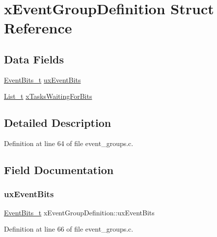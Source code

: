 \hypertarget{structx_event_group_definition}{}\section{x\+Event\+Group\+Definition Struct Reference}
\label{structx_event_group_definition}
\subsection*{Data Fields}
\begin{DoxyCompactItemize}
\item 
\hyperlink{event__groups_8h_ab2f21b93db0b2a0ab64d7a81ff32ac2e}{Event\+Bits\+\_\+t} \hyperlink{structx_event_group_definition_ad7c19a46f5f4557e466209962b5e4610}{ux\+Event\+Bits}
\item 
\hyperlink{list_8h_afd590ef6400071b4d63d65ef90bea7f4}{List\+\_\+t} \hyperlink{structx_event_group_definition_a6570ba98d93dcba9cb03de0c62df9044}{x\+Tasks\+Waiting\+For\+Bits}
\end{DoxyCompactItemize}


\subsection{Detailed Description}


Definition at line 64 of file event\+\_\+groups.\+c.



\subsection{Field Documentation}
\mbox{\label{structx_event_group_definition_ad7c19a46f5f4557e466209962b5e4610}} 
\subsubsection{\texorpdfstring{ux\+Event\+Bits}{uxEventBits}}
{\footnotesize\ttfamily \hyperlink{event__groups_8h_ab2f21b93db0b2a0ab64d7a81ff32ac2e}{Event\+Bits\+\_\+t} x\+Event\+Group\+Definition\+::ux\+Event\+Bits}



Definition at line 66 of file event\+\_\+groups.\+c.

